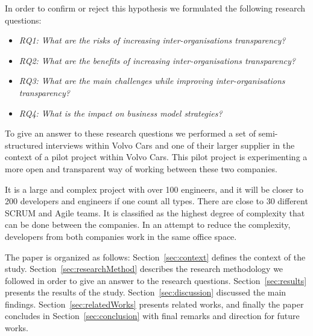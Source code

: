 In order to confirm or reject this hypothesis we formulated the following research questions: %

\begin{itemize}
\item {\em RQ1: What are the risks of increasing inter-organisations transparency?}
\item {\em RQ2: What are the benefits of increasing inter-organisations transparency?} %
\item {\em RQ3: What are the main challenges while improving inter-organisations transparency?}
\item {\em RQ4: What is the impact on business model strategies?}
\end{itemize}

To give an answer to these research questions we performed a set of semi-structured interviews within Volvo Cars and 
one of their larger supplier in the context of a pilot project within Volvo Cars. This pilot project is experimenting a more open and transparent way of working between these two companies.

It is a large and complex project with over 100 engineers, and it will be closer to 200 developers and engineers if one count all types. There are close to 30 different SCRUM and Agile teams. It is classified as the highest degree of complexity that can be done between the companies. In an attempt to reduce the complexity, developers from both companies work in the same office space.



The paper is organized as follows: Section~\ref{sec:context} defines the context of the study. Section~\ref{sec:researchMethod} describes the research methodology we followed in order to give an answer to the research questions. Section~\ref{sec:results} presents the results of the study. Section~\ref{sec:discussion} discussed the main findings. Section~\ref{sec:relatedWorks} presents related works, and finally the paper concludes in Section~\ref{sec:conclusion} with final remarks and direction for future works.